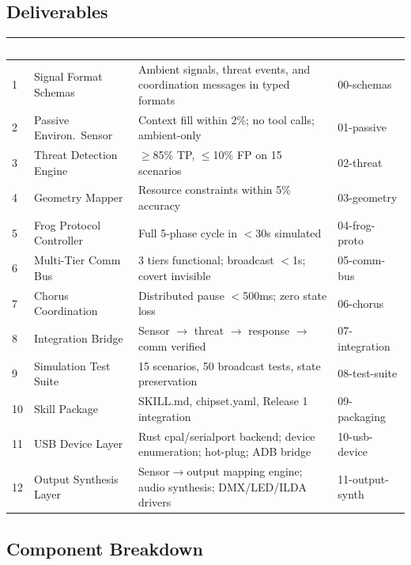 \documentclass[11pt,letterpaper]{article}
\newcommand{\tableheader}[1]{\textbf{\sffamily\textcolor{white}{#1}}}
\begin{document}
\subsection{Deliverables}

\begin{center}
\begin{tabularx}{\textwidth}{C{0.5cm}L{3cm}X L{2.5cm}}
\toprule
{}
\tableheader{\#} & \tableheader{Deliverable} & \tableheader{Acceptance Criteria} & \tableheader{Spec} \\
 & Signal Format Schemas & Ambient signals, threat events, and coordination messages in typed formats & 00-schemas \\
2 & Passive Environ.\ Sensor & Context fill within 2\%; no tool calls; ambient-only & 01-passive \\
3 & Threat Detection Engine & $\geq$85\% TP, $\leq$10\% FP on 15 scenarios & 02-threat \\
4 & Geometry Mapper & Resource constraints within 5\% accuracy & 03-geometry \\
5 & Frog Protocol Controller & Full 5-phase cycle in $<$30s simulated & 04-frog-proto \\
6 & Multi-Tier Comm Bus & 3 tiers functional; broadcast $<$1s; covert invisible & 05-comm-bus \\
7 & Chorus Coordination & Distributed pause $<$500ms; zero state loss & 06-chorus \\
8 & Integration Bridge & Sensor $\to$ threat $\to$ response $\to$ comm verified & 07-integration \\
9 & Simulation Test Suite & 15 scenarios, 50 broadcast tests, state preservation & 08-test-suite \\
10 & Skill Package & SKILL.md, chipset.yaml, Release 1 integration & 09-packaging \\
11 & USB Device Layer & Rust cpal/serialport backend; device enumeration; hot-plug; ADB bridge & 10-usb-device \\
12 & Output Synthesis Layer & Sensor$\to$output mapping engine; audio synthesis; DMX/LED/ILDA drivers & 11-output-synth \\
\bottomrule
\end{tabularx}
\end{center}

\subsection{Component Breakdown}
\end{document}

